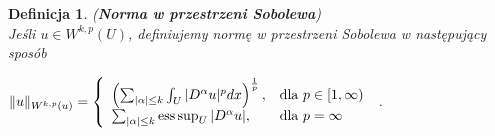 \documentclass[12pt,a4paper,oneside,titlepage]{article}
\newtheorem{Def}{Definicja}
\DeclareMathOperator*{\esssup}{ess\,sup}
\begin{document}
\begin{Def} (\textbf{Norma w przestrzeni Sobolewa}) \\  Jeśli $u \in W^{k,p}(U)$, definiujemy normę w przestrzeni Sobolewa w następujący sposób
\begin{center}
$
\Vert u \Vert_{W^{k,p}(u)}  = \left\{ \begin{array}{ll}
 \left( \sum_{\vert \alpha \vert \leq k } \int_{U} \vert D^{\alpha} u \vert^{p} dx\right)^{\frac{1}{p}}, & \textrm{dla $p \in [1,\infty)$}\\
\sum_{\vert \alpha \vert \leq k} \esssup_{U} \vert D^{\alpha} u \vert, & \textrm{dla $ p = \infty $} \\
\end{array} \right.
$ .
\end{center}
\end{Def}
\end{document}
